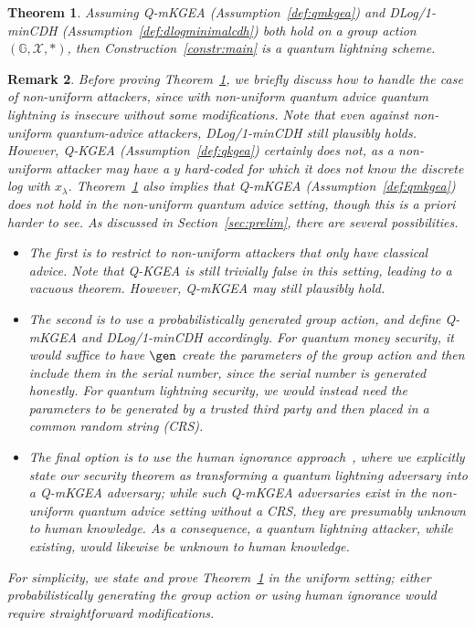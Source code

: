 \documentclass{article}\usepackage[a4paper,margin=20mm]{geometry}
\newtheorem{theorem}{Theorem}\newtheorem{lemma}[theorem]{Lemma}\newtheorem{proposition}[theorem]{Proposition}\newtheorem{corollary}[theorem]{Corollary}\newtheorem{definition}[theorem]{Definition}\newtheorem{claim}[theorem]{Claim}\newtheorem{remark}[theorem]{Remark}\newtheorem{observation}[theorem]{Observation}\newtheorem{conjecture}[theorem]{Conjecture}\newtheorem{example}[theorem]{Example}
\numberwithin{theorem}{section}
\numberwithin{equation}{section}
\newcommand{\G}{\mathbb{G}}
\newcommand{\Xs}{{\mathcal{X}}}
\begin{document}
\begin{theorem}\label{thm:main2} Assuming Q-mKGEA (Assumption~\ref{def:qmkgea}) and DLog/1-minCDH (Assumption~\ref{def:dlogminimalcdh}) both hold on a group action $(\G,\Xs,*)$, then Construction~\ref{constr:main} is a quantum lightning scheme.
\end{theorem}
\begin{remark}Before proving Theorem~\ref{thm:main2}, we briefly discuss how to handle the case of non-uniform attackers, since with non-uniform quantum advice quantum lightning is insecure without some modifications. Note that even against non-uniform quantum-advice attackers, DLog/1-minCDH still plausibly holds. However, Q-KGEA (Assumption~\ref{def:qkgea}) certainly does not, as a non-uniform attacker may have a $y$ hard-coded for which it does not know the discrete log with $x_\lambda$. Theorem~\ref{thm:main2} also implies that Q-mKGEA (Assumption~\ref{def:qmkgea}) does not hold in the non-uniform quantum advice setting, though this is a priori harder to see. As discussed in Section~\ref{sec:prelim}, there are several possibilities. 
	\begin{itemize}
		\item The first is to restrict to non-uniform attackers that only have classical advice. Note that Q-KGEA is still trivially false in this setting, leading to a vacuous theorem. However, Q-mKGEA may still plausibly hold.
		\item The second is to use a probabilistically generated group action, and define Q-mKGEA and DLog/1-minCDH accordingly. For quantum money security, it would suffice to have $\gen$ create the parameters of the group action and then include them in the serial number, since the serial number is generated honestly. For quantum lightning security, we would instead need the parameters to be generated by a trusted third party and then placed in a common random string (CRS). 
		\item The final option is to use the human ignorance approach~\cite{VIETCRYPT:Rogaway06}, where we explicitly state our security theorem as transforming a quantum lightning adversary into a Q-mKGEA adversary; while such Q-mKGEA adversaries exist in the non-uniform quantum advice setting without a CRS, they are presumably unknown to human knowledge. As a consequence, a quantum lightning attacker, while existing, would likewise be unknown to human knowledge. 
	\end{itemize}
	For simplicity, we state and prove Theorem~\ref{thm:main2} in the uniform setting; either probabilistically generating the group action or using human ignorance would require straightforward modifications. 
\end{remark}
\end{document}
